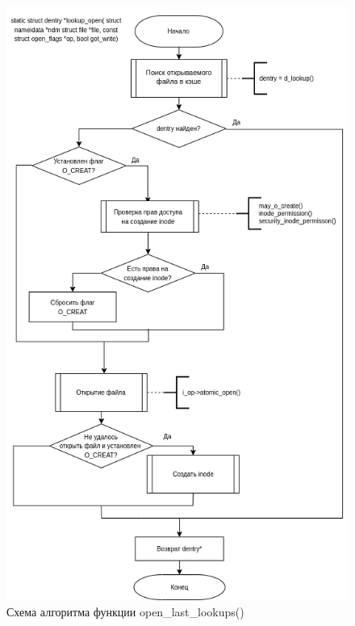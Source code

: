 \begin{figure}[H]
	\centering
	\includegraphics[scale=0.6]{assets/open-lookup_open.drawio.png}
	\caption{Схема алгоритма функции open\_last\_lookups()}
\end{figure}



